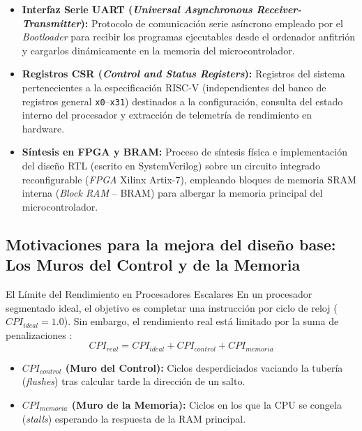 \documentclass[10pt,a4paper]{article}
\begin{document}
\begin{itemize}
    (\texttt{LW}/\texttt{SW}).
    \item \textbf{Interfaz Serie UART (\textit{Universal Asynchronous Receiver-Transmitter}):} Protocolo de comunicación serie asíncrono empleado por el 
    \textit{Bootloader} para recibir los programas ejecutables desde el ordenador anfitrión y cargarlos dinámicamente en la memoria del microcontrolador.
    \item \textbf{Registros CSR (\textit{Control and Status Registers}):} Registros del sistema pertenecientes a la especificación RISC-V (independientes del banco 
    de registros general \texttt{x0}--\texttt{x31}) destinados a la configuración, consulta del estado interno del procesador y extracción de telemetría de rendimiento 
    en hardware.
    \item \textbf{Síntesis en FPGA y BRAM:} Proceso de síntesis física e implementación del diseño RTL (escrito en SystemVerilog) sobre un circuito integrado 
    reconfigurable (\textit{FPGA} Xilinx Artix-7), empleando bloques de memoria SRAM interna (\textit{Block RAM} -- BRAM) para albergar la memoria principal del 
    microcontrolador.
\end{itemize}

\subsection{Motivaciones para la mejora del diseño base: Los Muros del Control y de la Memoria}

\begin{conceptbox}{El Límite del Rendimiento en Procesadores Escalares}
    En un procesador segmentado ideal, el objetivo es completar una instrucción por ciclo de reloj ($CPI_{ideal} = 1.0$). Sin embargo, el rendimiento real está 
    limitado por la suma de penalizaciones \cite{hennessy2025}:
    \begin{equation*}
        CPI_{real} = CPI_{ideal} + CPI_{control} + CPI_{memoria}
    \end{equation*}
    \begin{itemize}
        \item \textbf{$CPI_{control}$ (Muro del Control):} Ciclos desperdiciados vaciando la tubería (\textit{flushes}) tras calcular tarde la dirección de un salto.
        \item \textbf{$CPI_{memoria}$ (Muro de la Memoria):} Ciclos en los que la CPU se congela (\textit{stalls}) esperando la respuesta de la RAM principal.
    \end{itemize}
\end{conceptbox}
\end{document}
